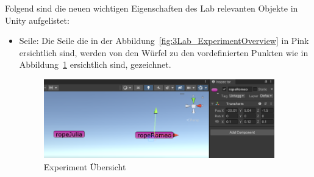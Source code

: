\documentclass[../main.tex]{subfiles}
\begin{document}
    Folgend sind die neuen wichtigen Eigenschaften des Lab relevanten Objekte in Unity aufgelistet:
    \begin{itemize}
        \item Seile:
        Die Seile die in der Abbildung~\ref{fig:3Lab_ExperimentOverview} in Pink ersichtlich sind, werden von den Würfel
        zu den vordefinierten Punkten wie in Abbildung~\ref{fig:3Lab_Robes} ersichtlich sind, gezeichnet.
        \begin{figure}[H]
            \begin{center}
                \centerline{\includegraphics[width=100mm]{./images/3Lab_Robes}}
                \caption{Experiment Übersicht}
                \label{fig:3Lab_Robes}
            \end{center}
        \end{figure}
    \end{itemize}
\end{document}
